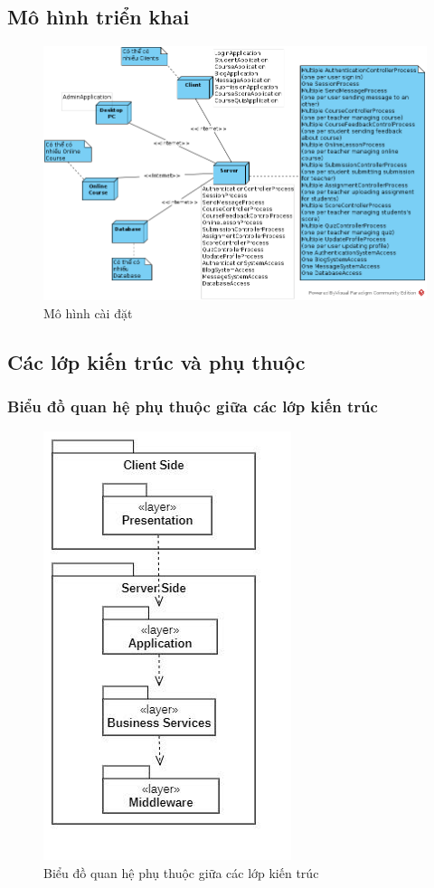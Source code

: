 \documentclass[./../main_file.tex]{subfiles}
\begin{document}
\subsection{Mô hình triển khai}

\begin{figure}[H]
	\centering
	\includegraphics[width=\linewidth]{./images/deployment_model.png}
	\caption{Mô hình cài đặt}
\end{figure}

\subsection{Các lớp kiến trúc và phụ thuộc}

\subsubsection{Biểu đồ quan hệ phụ thuộc giữa các lớp kiến trúc}

\begin{figure}[H]
	\centering
	\includegraphics[width=0.5\linewidth]{./images/lop_kien_truc.jpg}
	\caption{Biểu đồ quan hệ phụ thuộc giữa các lớp kiến trúc}
\end{figure}
\end{document}
